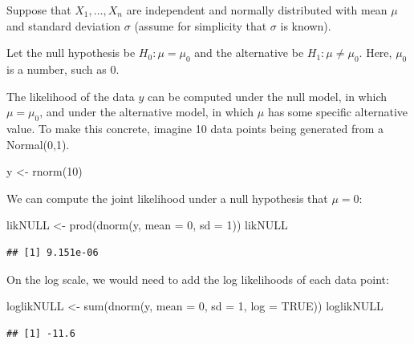 \documentclass[
  12pt,
]{krantz}
\newenvironment{Shaded}{\begin{snugshade}}{\end{snugshade}}
\newcommand{\AttributeTok}[1]{\textcolor[rgb]{0.77,0.63,0.00}{#1}}
\newcommand{\ConstantTok}[1]{\textcolor[rgb]{0.00,0.00,0.00}{#1}}
\newcommand{\DecValTok}[1]{\textcolor[rgb]{0.00,0.00,0.81}{#1}}
\newcommand{\FunctionTok}[1]{\textcolor[rgb]{0.00,0.00,0.00}{#1}}
\newcommand{\NormalTok}[1]{#1}
\newcommand{\OtherTok}[1]{\textcolor[rgb]{0.56,0.35,0.01}{#1}}
\theoremstyle{definition}
\theoremstyle{definition}
\theoremstyle{definition}
\theoremstyle{definition}
\theoremstyle{remark}
\begin{document}
Suppose that \(X_1,\dots, X_n\) are independent and normally distributed with mean \(\mu\) and standard deviation \(\sigma\) (assume for simplicity that \(\sigma\) is known).

Let the null hypothesis be \(H_0: \mu=\mu_0\) and the alternative be \(H_1: \mu\neq \mu_0\). Here, \(\mu_0\) is a number, such as \(0\).

The likelihood of the data \(y\) can be computed under the null model, in which \(\mu=\mu_0\), and under the alternative model, in which \(\mu\) has some specific alternative value. To make this concrete, imagine 10 data points being generated from a Normal(0,1).

\begin{Shaded}
\begin{Highlighting}[]
\NormalTok{y }\OtherTok{\textless{}{-}} \FunctionTok{rnorm}\NormalTok{(}\DecValTok{10}\NormalTok{)}
\end{Highlighting}
\end{Shaded}

We can compute the joint likelihood under a null hypothesis that \(\mu=0\):

\begin{Shaded}
\begin{Highlighting}[]
\NormalTok{likNULL }\OtherTok{\textless{}{-}} \FunctionTok{prod}\NormalTok{(}\FunctionTok{dnorm}\NormalTok{(y, }\AttributeTok{mean =} \DecValTok{0}\NormalTok{, }\AttributeTok{sd =} \DecValTok{1}\NormalTok{))}
\NormalTok{likNULL}
\end{Highlighting}
\end{Shaded}

\begin{verbatim}
## [1] 9.151e-06
\end{verbatim}

On the log scale, we would need to add the log likelihoods of each data point:

\begin{Shaded}
\begin{Highlighting}[]
\NormalTok{loglikNULL }\OtherTok{\textless{}{-}} \FunctionTok{sum}\NormalTok{(}\FunctionTok{dnorm}\NormalTok{(y, }\AttributeTok{mean =} \DecValTok{0}\NormalTok{, }\AttributeTok{sd =} \DecValTok{1}\NormalTok{, }\AttributeTok{log =} \ConstantTok{TRUE}\NormalTok{))}
\NormalTok{loglikNULL}
\end{Highlighting}
\end{Shaded}

\begin{verbatim}
## [1] -11.6
\end{verbatim}
\end{document}
